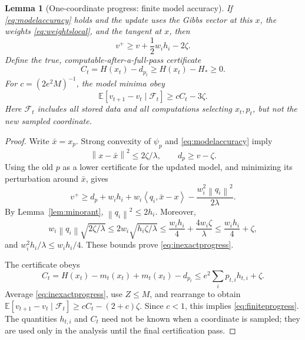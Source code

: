 \documentclass[11pt,a4paper]{article}
\newtheorem{lemma}[theorem]{Lemma}
\theoremstyle{definition}\newtheorem{definition}[theorem]{Definition}
\theoremstyle{remark}\newtheorem{remark}[theorem]{Remark}
\newcommand{\E}{\mathbb E}
\newcommand{\norm}[1]{\left\|#1\right\|}
\newcommand{\ip}[2]{\left\langle#1,#2\right\rangle}
\begin{document}
\begin{lemma}[One-coordinate progress: finite model accuracy]\label{lem:inexactprogress}
If \eqref{eq:modelaccuracy} holds and the update uses the Gibbs vector at this $x$, the weights \eqref{eq:weightslocal}, and the tangent at $x$, then
\begin{equation}\label{eq:inexactprogress}
 v^+\ge v+\frac12w_i h_i-2\zeta.
\end{equation}
Define the true, computable-after-a-full-pass certificate
\begin{equation}\label{eq:cert}
 C_t=H(x_t)-d_{p_t}\ge H(x_t)-H_*\ge0.
\end{equation}
For $c=(2e^2M)^{-1}$, the model minima obey
\begin{equation}\label{eq:finiteprogress}
 \E[v_{t+1}-v_t\mid\mathcal F_t]\ge c C_t-3\zeta.
\end{equation}
Here $\mathcal F_t$ includes all stored data and all computations selecting $x_t,p_t$, but not the new sampled coordinate.
\end{lemma}
\begin{proof}
Write $\bar x=x_p$. Strong convexity of $\psi_p$ and \eqref{eq:modelaccuracy} imply
\[
 \norm{x-\bar x}^2\le2\zeta/\lambda,\qquad d_p\ge v-\zeta.
\]
Using the old $p$ as a lower certificate for the updated model, and minimizing its perturbation around $\bar x$, gives
\[
 v^+\ge d_p+w_i h_i+w_i\ip{q_i}{\bar x-x}
                   -\frac{w_i^2\norm{q_i}^2}{2\lambda}.
\]
By Lemma~\ref{lem:minorant}, $\norm{q_i}^2\le2h_i$. Moreover,
\[
 w_i\norm{q_i}\sqrt{2\zeta/\lambda}
 \le2w_i\sqrt{h_i\zeta/\lambda}
 \le\frac{w_i h_i}{4}+\frac{4w_i\zeta}{\lambda}
 \le\frac{w_i h_i}{4}+\zeta,
\]
and $w_i^2h_i/\lambda\le w_i h_i/4$. These bounds prove \eqref{eq:inexactprogress}.

The certificate obeys
\[
 C_t=H(x_t)-m_t(x_t)+m_t(x_t)-d_{p_t}
 \le e^2\sum_i p_{t,i}h_{t,i}+\zeta.
\]
Average \eqref{eq:inexactprogress}, use $Z\le M$, and rearrange to obtain
$\E[v_{t+1}-v_t\mid\mathcal F_t]\ge c C_t-(2+c)\zeta$.
Since $c<1$, this implies \eqref{eq:finiteprogress}. The quantities $h_{t,i}$ and $C_t$ need not be known when a coordinate is sampled; they are used only in the analysis until the final certification pass.
\end{proof}
\end{document}
